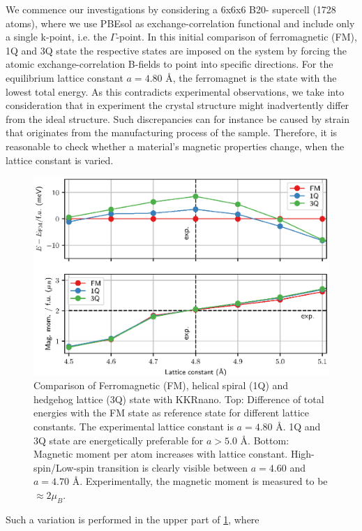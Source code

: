 \documentclass[graybox]{svmult}
\begin{document}
We commence our investigations by considering a 6x6x6 B20- supercell (1728 atoms), where we use PBEsol 
as exchange-correlation functional
and include only a single k-point, i.e. the $\Gamma$-point.
In this initial comparison of ferromagnetic (FM), 1Q and 3Q state the respective states are imposed on
the system by forcing the atomic exchange-correlation B-fields
to point into specific directions. 
For the equilibrium lattice constant
$a=4.80$ \AA, the ferromagnet is the state with the lowest total energy.
As this contradicts experimental observations, we take into consideration that
in experiment the crystal structure might inadvertently differ from the ideal structure.
Such discrepancies can for instance be caused by strain that 
originates from the manufacturing process of the sample.
Therefore, it is reasonable to check whether a material's magnetic properties change, when the
lattice constant is varied.
\begin{figure}[htb]
  \centering
   \includegraphics[width=1.00\textwidth]{Figures/MnGe_ferro_1q.eps}
	\caption{Comparison of Ferromagnetic (FM), helical spiral (1Q) and hedgehog lattice (3Q) 
	state with KKRnano.
	Top: Difference of total energies with the FM state as reference state for different
	lattice constants. The experimental lattice constant is $a=4.80$ \AA. 1Q and 3Q state
	are energetically preferable for $a > 5.0$ \AA.
	Bottom: Magnetic moment per  atom increases with lattice constant.
	High-spin/Low-spin transition is clearly visible between $a=4.60$ and $a=4.70$ \AA.
	Experimentally, the magnetic moment is measured to be $\approx 2 \mu_B$.}
\label{fig:MnGe_kkrnano_comparison}
\end{figure}
Such a variation is performed in the upper part of \cref{fig:MnGe_kkrnano_comparison}, where
\end{document}

